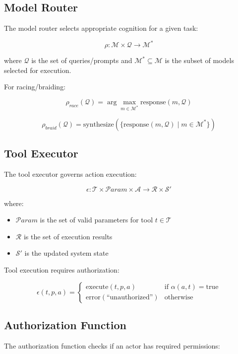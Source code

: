\documentclass[11pt,a4paper]{article}
\begin{document}
\subsection{Model Router}

The model router selects appropriate cognition for a given task:

\[
\rho: \mathcal{M} \times \mathcal{Q} \rightarrow \mathcal{M}^*
\]

where $\mathcal{Q}$ is the set of queries/prompts and $\mathcal{M}^* \subseteq \mathcal{M}$ is the subset of models selected for execution.

For racing/braiding:

\[
\rho_{race}(\mathcal{Q}) = \arg\max_{m \in \mathcal{M}^*} \text{response}(m, \mathcal{Q})
\]

\[
\rho_{braid}(\mathcal{Q}) = \text{synthesize}(\{\text{response}(m, \mathcal{Q}) \mid m \in \mathcal{M}^*\})
\]

\subsection{Tool Executor}

The tool executor governs action execution:

\[
\epsilon: \mathcal{T} \times \mathcal{P}aram \times \mathcal{A} \rightarrow \mathcal{R} \times \mathcal{S}'
\]

where:
\begin{itemize}
    \item $\mathcal{P}aram$ is the set of valid parameters for tool $t \in \mathcal{T}$
    \item $\mathcal{R}$ is the set of execution results
    \item $\mathcal{S}'$ is the updated system state
\end{itemize}

Tool execution requires authorization:

\[
\epsilon(t, p, a) = \begin{cases}
\text{execute}(t, p, a) & \text{if } \alpha(a, t) = \text{true} \\
\text{error}(\text{``unauthorized''}) & \text{otherwise}
\end{cases}
\]

\subsection{Authorization Function}

The authorization function checks if an actor has required permissions:
\end{document}
